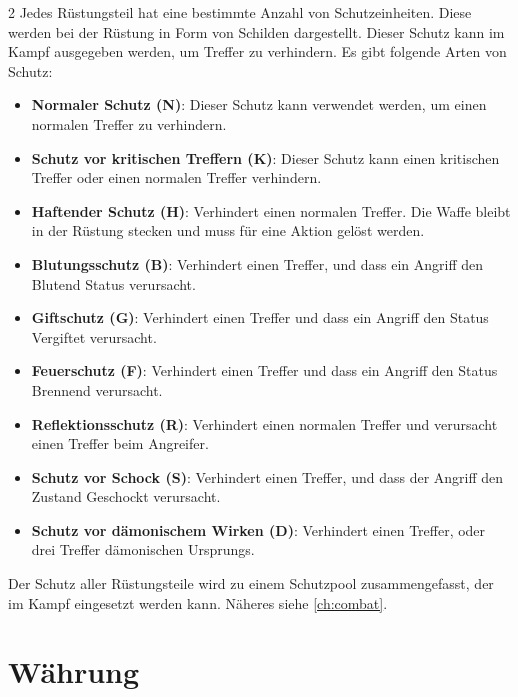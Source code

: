 \begin{multicols}{2}
Jedes Rüstungsteil hat eine bestimmte Anzahl von Schutzeinheiten. Diese werden bei der Rüstung in Form von Schilden dargestellt. Dieser Schutz kann im Kampf ausgegeben werden, um Treffer zu verhindern. Es gibt folgende Arten von Schutz:
\begin{itemize}
    \item \textbf{Normaler Schutz (N)}: Dieser Schutz kann verwendet werden, um einen normalen Treffer zu verhindern.
    \item \textbf{Schutz vor kritischen Treffern (K)}: Dieser Schutz kann einen kritischen Treffer oder einen normalen Treffer verhindern.
    \item \textbf{Haftender Schutz (H)}: Verhindert einen normalen Treffer. Die Waffe bleibt in der Rüstung stecken und muss für eine Aktion gelöst werden.
    \item \textbf{Blutungsschutz (B)}: Verhindert einen Treffer, und dass ein Angriff den Blutend Status verursacht.
    \item \textbf{Giftschutz (G)}: Verhindert einen Treffer und dass ein Angriff den Status Vergiftet verursacht.
    \item \textbf{Feuerschutz (F)}: Verhindert einen Treffer und dass ein Angriff den Status Brennend verursacht.
    \item \textbf{Reflektionsschutz (R)}: Verhindert einen normalen Treffer und verursacht einen Treffer beim Angreifer.
    \item \textbf{Schutz vor Schock (S)}: Verhindert einen Treffer, und dass der Angriff den Zustand Geschockt verursacht.
    \item \textbf{Schutz vor dämonischem Wirken (D)}: Verhindert einen Treffer, oder drei Treffer dämonischen Ursprungs.
\end{itemize}

Der Schutz aller Rüstungsteile wird zu einem Schutzpool zusammengefasst, der im Kampf eingesetzt werden kann. Näheres siehe \cref{ch:combat}.

\section{Währung}

\end{multicols}
